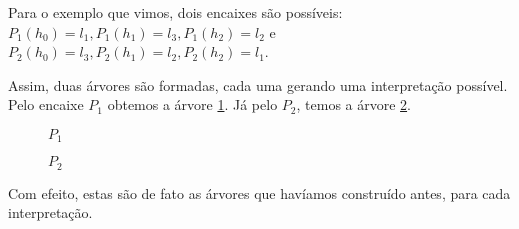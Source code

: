 Para o exemplo que vimos, dois encaixes são possíveis: $P_1(h_0) = l_1, P_1(h_1) = l_3, P_1(h_2) = l_2$ e $P_2(h_0) = l_3, P_2(h_1) = l_2, P_2(h_2) = l_1$.

Assim, duas árvores são formadas, cada uma gerando uma interpretação possível. Pelo encaixe $P_1$ obtemos a árvore \ref{tree:p1}. Já pelo $P_2$, temos a árvore \ref{tree:p2}.

\begin{figure}[h]
\begin{center}
\end{center}
\caption{$P_1$}
\label{tree:p1}
\end{figure}

\begin{figure}[h]
\begin{center}
\end{center}
\caption{$P_2$}
\label{tree:p2}
\end{figure}

Com efeito, estas são de fato as árvores que havíamos construído antes, para cada interpretação.

